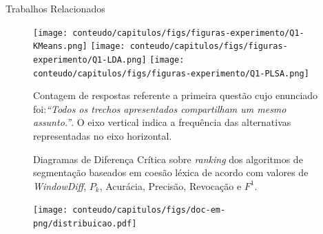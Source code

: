 \begin{frame}{Trabalhos Relacionados}
\begin{figure}[!h] \centering     %
		\texttt{[image: conteudo/capitulos/figs/figuras-experimento/Q1-KMeans.png]}
		\texttt{[image: conteudo/capitulos/figs/figuras-experimento/Q1-LDA.png]}
		\texttt{[image: conteudo/capitulos/figs/figuras-experimento/Q1-PLSA.png]}
	\caption{Contagem de respostas referente a primeira questão cujo enunciado foi:\textit{``Todos os trechos apresentados compartilham um mesmo assunto.''}. O eixo vertical indica a frequência das alternativas representadas no eixo horizontal. }
	\label{fig:Q1}
\end{figure}












\begin{figure}[!h]
	\centering     %


		\caption{Diagramas de Diferença Crítica sobre \textit{ranking} dos algoritmos de segmentação baseados em coesão léxica de acordo com valores de \textit{WindowDiff}, $P_k$, Acurácia, Precisão, Revocação e $F^1$.}
	\label{fig:CDs}
\end{figure}







  \begin{center}
	\begin{figure}[h!]

		\texttt{[image: conteudo/capitulos/figs/doc-em-png/distribuicao.pdf]}

	\end{figure}
\end{center}


\label{fig:distribuicao-ata}


\end{frame}
